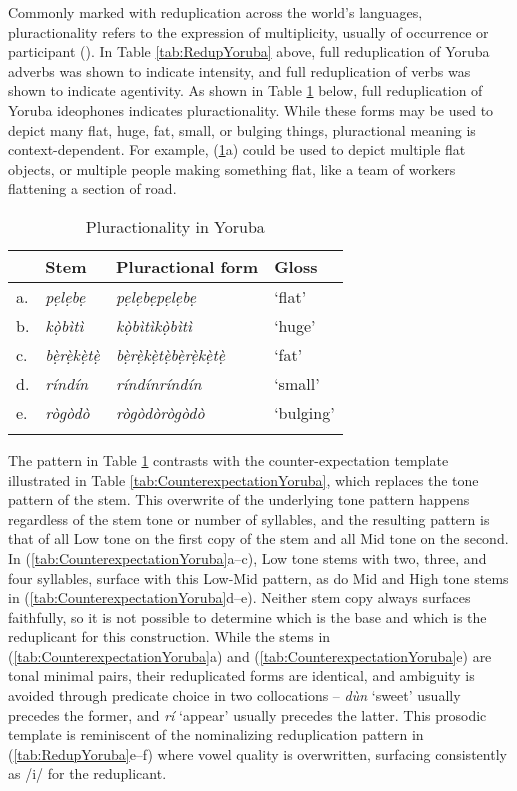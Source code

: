 \documentclass[output=paper,colorlinks,citecolor=brown]{langscibook}
\begin{document}
Commonly marked with reduplication across the world’s languages, pluractionality refers to the expression of multiplicity, usually of occurrence or participant (\citealt{Newman1980, Newman2012}). In Table \ref{tab:RedupYoruba} above, full reduplication of Yoruba adverbs was shown to indicate intensity, and full reduplication of verbs was shown to indicate agentivity. As shown in Table \ref{tab:PluractionalityYoruba} below, full reduplication of Yoruba ideophones indicates pluractionality. While these forms may be used to depict many flat, huge, fat, small, or bulging things, pluractional meaning is context-dependent. For example, (\ref{tab:PluractionalityYoruba}a) could be used to depict multiple flat objects, or multiple people making something flat, like a team of workers flattening a section of road.

\begin{table}
\caption{Pluractionality in Yoruba}
\label{tab:PluractionalityYoruba}
 \begin{tabular}{llll}
  \lsptoprule
   & Stem & Pluractional form        & Gloss   \\
   \midrule
a. & \textit{pẹlẹbẹ}         & \textit{pẹlẹbẹpẹlẹbẹ}             & `flat'    \\
b. & \textit{kọ̀bìtì}         & \textit{kọ̀bìtìkọ̀bìtì }          & `huge'    \\
c. & \textit{bẹ̀rẹ̀kẹ̀tẹ̀}       & \textit{bẹ̀rẹ̀kẹ̀tẹ̀bẹ̀rẹ̀kẹ̀tẹ̀} & `fat'     \\
d. & \textit{ríndín }        & \textit{ríndínríndín}             & `small'   \\
e. & \textit{rògòdò}         & \textit{rògòdòrògòdò }            & `bulging' \\
\lspbottomrule
 \end{tabular}
\end{table}

The pattern in Table \ref{tab:PluractionalityYoruba} contrasts with the counter-expectation  template illustrated in Table \ref{tab:CounterexpectationYoruba}, which replaces the tone pattern  of the stem. This overwrite of the underlying tone pattern happens regardless of the stem tone or number of syllables, and the resulting pattern is that of all Low tone on the first copy of the stem and all Mid tone on the second. In (\ref{tab:CounterexpectationYoruba}a--c), Low tone stems with two, three, and four syllables, surface with this Low-Mid pattern, as do Mid and High tone stems in (\ref{tab:CounterexpectationYoruba}d--e). Neither stem copy always surfaces faithfully, so it is not possible to determine which is the base and which is the reduplicant for this construction. While the stems in (\ref{tab:CounterexpectationYoruba}a) and (\ref{tab:CounterexpectationYoruba}e) are tonal minimal pairs, their reduplicated forms are identical, and ambiguity is avoided through predicate choice in two collocations -- \textit{dùn} ‘sweet’ usually precedes the former, and \textit{rí} ‘appear’ usually precedes the latter. This prosodic template is reminiscent of the nominalizing reduplication pattern in (\ref{tab:RedupYoruba}e--f) where vowel quality is overwritten, surfacing consistently as /i/ for the reduplicant.
\end{document}
